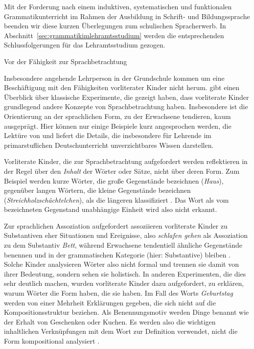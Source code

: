 Mit der Forderung nach einem induktiven, systematischen und funktionalen Grammatikunterricht im Rahmen der Ausbildung in Schrift- und Bildungssprache beenden wir diese kurzen Überlegungen zum schulischen Spracherwerb.
In Abschnitt~\ref{sec:grammatikimlehramtsstudium} werden die entsprechenden Schlussfolgerungen für das Lehramtsstudium gezogen.

\begin{Vertiefung}{Vor der Fähigkeit zur Sprachbetrachtung}
\label{vert:faehigkeitzursprachbetrachtung}

\noindent Insbesondere angehende Lehrperson in der Grundschule kommen um eine Beschäftigung mit den Fähigkeiten vorliterater Kinder nicht herum.
\citet[52--56]{Bredel2013} gibt einen Überblick über klassische Experimente, die gezeigt haben, dass vorliterate Kinder grundlegend andere Konzepte von Sprachbetrachtung haben.
Insbesondere ist die Orientierung an der sprachlichen Form, zu der Erwachsene tendieren, kaum ausgeprägt.
Hier können nur einige Beispiele kurz angesprochen werden, die Lektüre von \citet{Bredel2013} und \citet[71--134]{BredelEa2017} liefert die Details, die insbesondere für Lehrende im primarstuflichen Deutschunterricht unverzichtbares Wissen darstellen.

Vorliterate Kinder, die zur Sprachbetrachtung aufgefordert werden reflektieren in der Regel über den \textit{Inhalt} der Wörter oder Sätze, nicht über deren Form.
Zum Beispiel werden kurze Wörter, die große Gegenstände bezeichnen (\zB \textit{Haus}), gegenüber langen Wörtern, die kleine Gegenstände bezeichnen (\textit{Streichholzschächtelchen}), als die längeren klassifiziert \citep{Bosch1984}.
Das Wort als vom bezeichneten Gegenstand unabhängige Einheit wird also nicht erkannt.

Zur sprachlichen Assoziation aufgefordert assoziieren vorliterate Kinder zu Substantiven eher Situationen und Ereignisse, also \zB \textit{schlafen gehen} als Assoziation zu dem Substantiv \textit{Bett}, während Erwachsene tendentiell ähnliche Gegenstände benennen und in der grammatischen Kategorie (hier: Substantive) bleiben \citep{Entwistle1966}.
Solche Kinder analysieren Wörter also nicht formal und trennen sie damit von ihrer Bedeutung, sondern sehen sie holistisch.
In anderen Experimenten, die dies sehr deutlich machen, wurden vorliterate Kinder dazu aufgefordert, zu erklären, warum Wörter die Form haben, die sie haben.
Im Fall des Worts \textit{Geburtstag} werden \zB von einer Mehrheit Erklärungen gegeben, die sich nicht auf die Kompositionsstruktur beziehen.
Als Benennungsmotiv werden Dinge benannt wie der Erhalt von Geschenken oder Kuchen.
Es werden also die wichtigen inhaltlichen Verknüpfungen mit dem Wort zur Definition verwendet, nicht die Form kompositional analysiert \citep{Berko1974}.


\end{Vertiefung}
